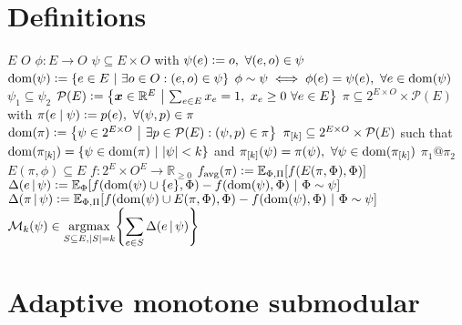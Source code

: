 ﻿%

\section{Definitions}

\begin{itemize}
   $E$
   $O$
   $\phi : E \to O$
   $\psi \subseteq E \times O$ with $\psi(e) \vcentcolon= o,\ \forall (e, o) \in \psi$
   $\dom(\psi) \defeq \sdef{e \in E}{\exists o \in O : (e, o) \in \psi}$
   $\phi \sim \psi \iff \phi(e) = \psi(e),\ \forall e \in \operatorname{dom}(\psi)$
   $\psi_1 \subseteq \psi_2$
   $\mathcal{P}(E) \defeq \sdef{\*x \in \mathbb{R}^E}{\sum_{e \in E} x_e = 1,\ x_e \geq 0\ \forall e \in E}$
   $\pi \subseteq 2^{E \times O} \times \mathcal{P}(E)$ with $\pi(e\mid\psi) \vcentcolon= p(e),\ \forall (\psi, p) \in \pi$
   $\dom(\pi) \defeq \sdef{\psi \in 2^{E \times O}}{\exists p \in \mathcal{P}(E) : (\psi, p) \in \pi}$
   $\pi_{[k]} \subseteq 2^{E \times O} \times \mathcal{P}(E)$ such that $\dom(\pik) = \sdef{\psi \in \dom(\pi)}{|\psi| < k}$ and $\pik(\psi) = \pi(\psi),\ \forall \psi \in \dom(\pik)$
   $\pi_1 @ \pi_2$
   $E(\pi, \phi) \subseteq E$
   $f : 2^E \times O^E \to \mathbb{R}_{\geq 0}$
   $\favg(\pi) \defeq \E[\Phi,\Pi]{f(E(\pi, \Phi), \Phi)}$
   $\D{e}{\psi} \defeq \E[\Phi]{f(\dom(\psi) \cup \{e\}, \Phi) - f(\dom(\psi), \Phi)}[\Phi \sim \psi]$
   $\D{\pi}{\psi} \defeq \E[\Phi,\Pi]{f(\dom(\psi) \cup E(\pi, \Phi), \Phi) - f(\dom(\psi), \Phi)}[\Phi \sim \psi]$
   $\mathcal{M}_k(\psi) \in \displaystyle\argmax_{S \subseteq E, |S| = k}\left\{\sum_{e \in S} \D{e}{\psi} \right\}$
\end{itemize}


\section{Adaptive monotone submodular}


